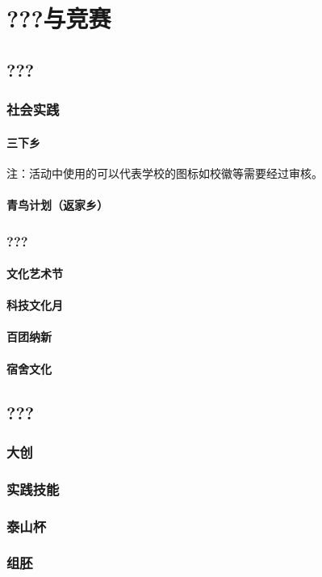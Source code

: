 \chapter[???与竞赛]{???与竞赛}
\section[???]{???}
\subsection[社会实践]{社会实践}
\subsubsection[三下乡]{三下乡}
注：活动中使用的可以代表学校的图标如校徽等需要经过审核。
\subsubsection[青鸟计划（返家乡）]{青鸟计划（返家乡）}
\subsection[???]{???}
\subsubsection[文化艺术节]{文化艺术节}
\subsubsection[科技文化月]{科技文化月}
\subsubsection[百团纳新]{百团纳新}
\subsubsection[宿舍文化]{宿舍文化}
\section[竞赛]{???}
\subsection[大创]{大创}
\subsection[实践技能]{实践技能}
\subsection[泰山杯]{泰山杯}
\subsection[组胚]{组胚}

